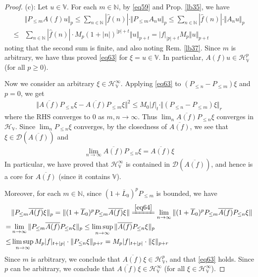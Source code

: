 \documentclass[12pt,b5paper,notitlepage]{article}
\theoremstyle{definition}
\theoremstyle{plain}
\newcommand{\wht}{\widehat}
\newcommand{\ovl}{\overline}
\newcommand{\Dom}{\scr{D}}
\newcommand{\scr}{\mathscr}
\newcommand{\Vbb}{\mathbb V}
\newcommand{\Nbb}{\mathbb N}
\newcommand{\HV}{\mathcal H_{\mathbb V}}
\numberwithin{equation}{section}
\begin{document}
\begin{proof}
(c): Let $u\in\Vbb$. For each $m\in\Nbb$, by \eqref{eq59} and Prop. \ref{lb35}, we have
\begin{align*}
&\Vert P_{\leq m}A(f)u\Vert_p\leq\sum_{n\in\Nbb}|\wht f(n)|\cdot \Vert P_{\leq m}A_nu\Vert_p\leq \sum_{n\in\Nbb}|\wht f(n)|\cdot \Vert A_nu\Vert_p\\
\leq& \sum_{n\in\Nbb} |\wht f(n)|\cdot M_p(1+|n|)^{|p|+t}\Vert u\Vert_{p+t}=|f|_{|p|+t}M_p\Vert u\Vert_{p+t}
\end{align*}
noting that the second sum is finite, and also noting Rem. \ref{lb37}. Since $m$ is arbitrary, we have thus proved \eqref{eq63} for $\xi=u\in\Vbb$. In particular, $A(f)u\in\HV^p$ (for all $p\geq0$).


Now we consider an arbitrary $\xi\in\HV^\infty$. Applying \eqref{eq63} to $(P_{\leq n}-P_{\leq m})\xi$ and $p=0$, we get 
\begin{align*}
\Vert  \ovl{A(f)}P_{\leq n}\xi-\ovl{A(f)}P_{\leq m}\xi\Vert^2\leq M_0|f|_t\cdot\Vert (P_{\leq n}-P_{\leq m})\xi\Vert_r
\end{align*}
where the RHS converges to $0$ as $m,n\rightarrow\infty$. Thus $\lim_n \ovl{A(f)}P_{\leq n}\xi$ converges in $\HV$. Since $\lim_n P_{\leq n}\xi$ converges, by the closedness of $\ovl{A(f)}$, we see that $\xi\in\Dom(\ovl{A(f)})$ and
\begin{align*}
\lim_{n\rightarrow\infty} \ovl{A(f)}P_{\leq n}\xi=\ovl{A(f)}\xi \tag{$\triangle$} \label{eq64}
\end{align*}
In particular, we have proved that $\HV^\infty$ is contained in $\Dom(\ovl{A(f)})$, and hence is a core for $\ovl{A(f)}$ (since it contains $\Vbb$). 

Moreover,  for each $m\in\Nbb$, since $ (1+{\ovl L_0})^pP_{\leq m}$ is bounded, we have
\begin{align*}
&\Vert P_{\leq m}\ovl{A(f)}\xi\Vert_p=\Vert (1+{\ovl L_0})^pP_{\leq m}\ovl{A(f)}\xi\Vert\xlongequal{\eqref{eq64}}\lim_{n\rightarrow\infty}\Vert (1+{\ovl L_0})^pP_{\leq m}\ovl{A(f)}P_{\leq n}\xi\Vert\\
=&\lim_{n\rightarrow\infty}\Vert P_{\leq m}\ovl{A(f)}P_{\leq n}\xi\Vert_p\leq \limsup_{n\rightarrow\infty}\Vert \ovl{A(f)}P_{\leq n}\xi\Vert_p\\
\leq& \limsup_{n\rightarrow\infty}M_p|f|_{t+|p|}\cdot \Vert P_{\leq n}\xi\Vert_{p+r}= M_p|f|_{t+|p|}\cdot \Vert \xi\Vert_{p+r}
\end{align*}
Since $m$ is arbitrary, we conclude that $\ovl{A(f)}\xi\in \HV^p$, and that \eqref{eq63} holds. Since $p$ can be arbitrary, we conclude that $\ovl{A(f)}\xi\in\HV^\infty$ (for all $\xi\in\HV^\infty$).
\end{proof}
\end{document}
